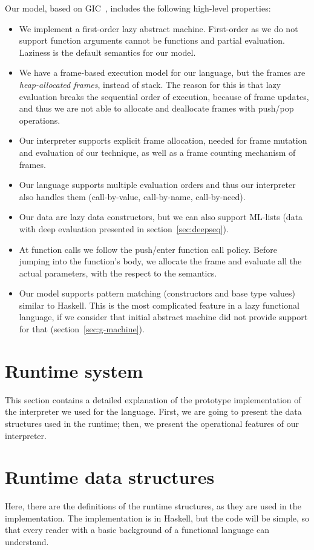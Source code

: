 \documentclass[diploma]{softlab-thesis}
\begin{document}
Our model, based on GIC~\cite{Fourtounis14}, 
includes the following high-level properties:
\begin{itemize}
  \item We implement a first-order lazy abstract machine. First-order as we do not support
  function arguments cannot be functions and partial evaluation. Laziness is the default semantics
  for our model.
  \item We have a frame-based execution model for our language, but the frames are 
  \textit{heap-allocated frames}, instead of stack. The reason for this is that lazy evaluation 
  breaks the sequential order of execution, because of frame updates, and thus we are not able 
  to allocate and deallocate frames with push/pop operations.
  \item Our interpreter supports explicit frame allocation, needed for frame mutation and evaluation 
  of our technique, as well as a frame counting mechanism of frames.
  \item Our language supports multiple evaluation orders and thus our interpreter 
  also handles them (call-by-value, call-by-name, call-by-need).
  \item Our data are lazy data constructors, but we can also support ML-lists (data with deep evaluation
  presented in section~\ref{sec:deepseq}).
  \item At function calls we follow the push/enter function call policy. Before jumping into 
  the function's body, we allocate the frame and evaluate all the actual parameters, with the respect
  to the semantics. 
  \item Our model supports pattern matching (constructors and base type values) similar to Haskell. 
  This is the most complicated feature in a lazy functional language, if we consider that initial 
  abstract machine did not provide support for that (section~\ref{sec:g-machine}).
\end{itemize}

\section {Runtime system}
\label{sec:runtime-system}

This section contains a detailed explanation of the prototype implementation of the interpreter we 
used for the language. First, we are going to present the data structures used in the runtime; then, 
we present the operational features of our interpreter. 

\section{Runtime data structures}
\label{sec:runtime-structs}
Here, there are the definitions of the runtime structures, as they are used in the implementation. The 
implementation is in Haskell, but the code will be simple, so that every reader with a basic background of a functional 
language can understand.
\end{document}
